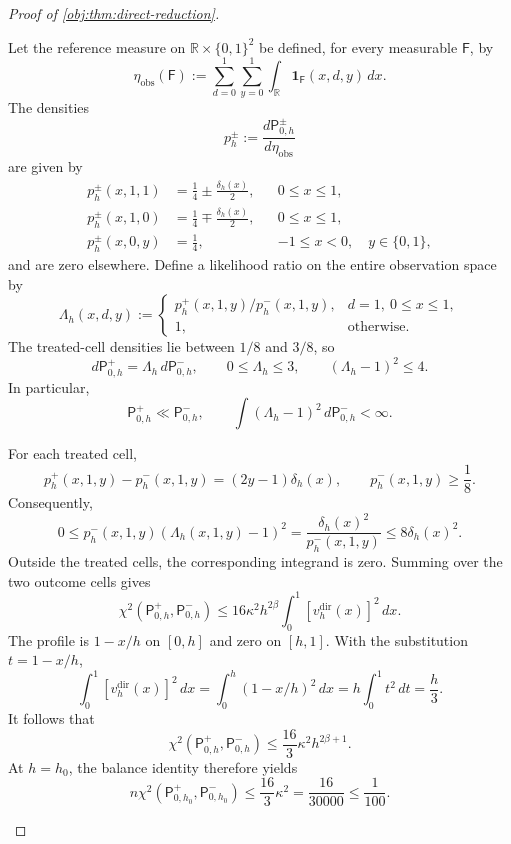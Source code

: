 \begin{proof}[Proof of \cref{obj:thm:direct-reduction}]
\begin{enumerate}
Let the reference measure on \(\mathbb R\times\{0,1\}^2\) be defined, for every measurable \(\mathsf F\), by
\[
\eta_{\mathrm{obs}}(\mathsf F)
:=\sum_{d=0}^1\sum_{y=0}^1
\int_{\mathbb R}\mathbf1_{\mathsf F}(x,d,y)\,dx.
\]
The densities
\[
p_h^\pm:=\frac{d\mathsf P_{0,h}^\pm}{d\eta_{\mathrm{obs}}}
\]
are given by
\[
\begin{aligned}
p_h^\pm(x,1,1)&=\frac14\pm\frac{\delta_h(x)}2,
&&0\le x\le1,\\
p_h^\pm(x,1,0)&=\frac14\mp\frac{\delta_h(x)}2,
&&0\le x\le1,\\
p_h^\pm(x,0,y)&=\frac14,
&&-1\le x<0,\quad y\in\{0,1\},
\end{aligned}
\]
and are zero elsewhere. Define a likelihood ratio on the entire observation space by
\[
\Lambda_h(x,d,y):=
\begin{cases}
p_h^+(x,1,y)/p_h^-(x,1,y),
&d=1,\ 0\le x\le1,\\
1,&\text{otherwise}.
\end{cases}
\]
The treated-cell densities lie between \(1/8\) and \(3/8\), so
\[
d\mathsf P_{0,h}^+
=\Lambda_h\,d\mathsf P_{0,h}^-,
\qquad
0\le\Lambda_h\le3,
\qquad
(\Lambda_h-1)^2\le4.
\]
In particular,
\[
\mathsf P_{0,h}^+\ll\mathsf P_{0,h}^-,
\qquad
\int(\Lambda_h-1)^2\,d\mathsf P_{0,h}^-<\infty.
\]

For each treated cell,
\[
p_h^+(x,1,y)-p_h^-(x,1,y)
=(2y-1)\delta_h(x),
\qquad
p_h^-(x,1,y)\ge\frac18.
\]
Consequently,
\[
0\le
p_h^-(x,1,y)(\Lambda_h(x,1,y)-1)^2
=\frac{\delta_h(x)^2}{p_h^-(x,1,y)}
\le8\delta_h(x)^2.
\]
Outside the treated cells, the corresponding integrand is zero. Summing over the two outcome cells gives
\[
\chi^2(\mathsf P_{0,h}^+,\mathsf P_{0,h}^-)
\le16\kappa^2h^{2\beta}
\int_0^1[v_h^{\mathrm{dir}}(x)]^2\,dx.
\]
The profile is \(1-x/h\) on \([0,h]\) and zero on \([h,1]\). With the substitution \(t=1-x/h\),
\[
\int_0^1[v_h^{\mathrm{dir}}(x)]^2\,dx
=\int_0^h(1-x/h)^2\,dx
=h\int_0^1t^2\,dt
=\frac h3.
\]
It follows that
\[
\chi^2(\mathsf P_{0,h}^+,\mathsf P_{0,h}^-)
\le\frac{16}{3}\kappa^2h^{2\beta+1}.
\]
At \(h=h_0\), the balance identity therefore yields
\[
n\chi^2(\mathsf P_{0,h_0}^+,\mathsf P_{0,h_0}^-)
\le\frac{16}{3}\kappa^2
=\frac{16}{30000}
\le\frac1{100}.
\]


\end{enumerate}
\end{proof}
